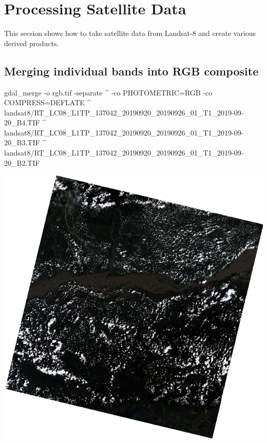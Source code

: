\documentclass[12pt,a4paper]{article}
\newenvironment{Shaded}{\begin{snugshade}}{\end{snugshade}}
\newcommand{\ExtensionTok}[1]{#1}
\newcommand{\NormalTok}[1]{#1}
\begin{document}
\hypertarget{processing-satellite-data}{%
\section{Processing Satellite Data}\label{processing-satellite-data}}

This secsion shows how to take satellite data from Landsat-8 and create
various derived products.

\hypertarget{merging-individual-bands-into-rgb-composite}{%
\subsection{Merging individual bands into RGB
composite}\label{merging-individual-bands-into-rgb-composite}}

\begin{Shaded}
\begin{Highlighting}[]
\ExtensionTok{gdal_merge}\NormalTok{ -o rgb.tif -separate ^}
  \ExtensionTok{-co}\NormalTok{ PHOTOMETRIC=RGB -co COMPRESS=DEFLATE ^}
  \ExtensionTok{landsat8/RT_LC08_L1TP_137042_20190920_20190926_01_T1_2019-09-20_B4.TIF}\NormalTok{ ^}
  \ExtensionTok{landsat8/RT_LC08_L1TP_137042_20190920_20190926_01_T1_2019-09-20_B3.TIF}\NormalTok{ ^}
  \ExtensionTok{landsat8/RT_LC08_L1TP_137042_20190920_20190926_01_T1_2019-09-20_B2.TIF}
\end{Highlighting}
\end{Shaded}

\begin{center}\includegraphics{images/gdal/rgb} \end{center}
\end{document}
